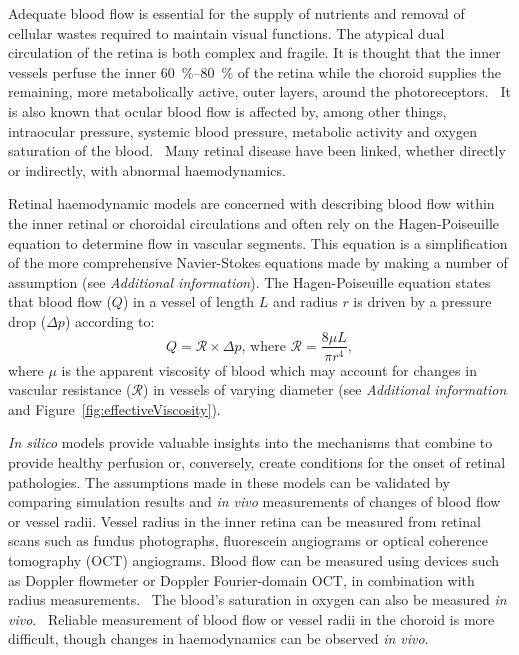 \documentclass[12pt,a4paper]{journal}
\begin{document}
Adequate blood flow is essential for the supply of nutrients and removal of cellular wastes required to maintain visual functions.
The atypical dual circulation of the retina is both complex and fragile.
It is thought that the inner vessels perfuse the inner \SIrange{60}{80}{\percent} of the retina while the choroid supplies the remaining, more metabolically active, outer layers, around the photoreceptors.~\cite{Birol_2007}
It is also known that ocular blood flow is affected by, among other things, intraocular pressure, systemic blood pressure, metabolic activity and oxygen saturation of the blood.~\cite{Birol_2007,McCullough_1997,Palkovits_2014,Polska_2007,Pournaras_2008,CERiva_1997,Wang_2014}
Many retinal disease have been linked, whether directly or indirectly, with abnormal haemodynamics.~\cite{Hayreh_2004,Medina_2016}

Retinal haemodynamic models are concerned with describing blood flow within the inner retinal or choroidal circulations and often rely on the Hagen-Poiseuille equation to determine flow in vascular segments.
This equation is a simplification of the more comprehensive Navier-Stokes equations made by making a number of assumption (see \textit{Additional information}).
The Hagen-Poiseuille equation states that blood flow ($Q$) in a vessel of length $L$ and radius $r$ is driven by a pressure drop ($\Delta p$) according to:
\begin{equation*}
  \label{eq:Hagen-Poiseuille}
  Q = \mathcal R\times\Delta p \mbox{, where } \mathcal{R} = \frac{8\mu L}{\pi r^4},
\end{equation*}
where $\mu$ is the apparent viscosity of blood which may account for changes in vascular resistance ($\mathcal R$) in vessels of varying diameter (see \textit{Additional information} and Figure~\ref{fig:effectiveViscosity}).

\textit{In silico} models provide valuable insights into the mechanisms that combine to provide healthy perfusion or, conversely, create conditions for the onset of retinal pathologies.
The assumptions made in these models can be validated by comparing simulation results and \textit{in vivo} measurements of changes of blood flow or vessel radii.
Vessel radius in the inner retina can be measured from retinal scans such as fundus photographs, fluorescein angiograms or optical coherence tomography (OCT) angiograms.
Blood flow can be measured using devices such as Doppler flowmeter or Doppler Fourier-domain OCT, in combination with radius measurements.~\cite{DoblhoffDier_2014,Wang_2009}
The blood's saturation in oxygen can also be measured \textit{in vivo}.~\cite{Geirsdottir_2013}
Reliable measurement of blood flow or vessel radii in the choroid is more difficult, though changes in haemodynamics can be observed \textit{in vivo}.~\cite{CERiva_1997,Scherm_2019}
\end{document}
